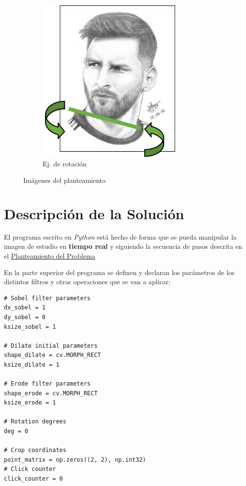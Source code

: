\documentclass[12pt, a4paper]{article}
\begin{document}
\begin{figure}[!ht]
\begin{subfigure}{0.25\textwidth}
    \end{subfigure}
    \hfill
    \begin{subfigure}{0.25\textwidth}
        \centering
        \includegraphics[width=0.8\textwidth]{img/sample-face-rotation.png}
        \caption{Ej. de rotación}
        \label{img:ejemplo-2}
    \end{subfigure}
    \caption{Imágenes del planteamiento}
\end{figure}

\section{Descripción de la Solución}
El programa escrito en \emph{Python} está hecho de forma que se pueda manipular la imagen de estudio en \textbf{tiempo real} y siguiendo la secuencia de pasos descrita en el \hyperref[Planteamiento]{Planteamiento del Problema}

En la parte superior del programa se definen y declaran los parámetros de los distintos filtros y otras operaciones que se van a aplicar:

\begin{lstlisting}
# Sobel filter parameters
dx_sobel = 1
dy_sobel = 0
ksize_sobel = 1

# Dilate initial parameters
shape_dilate = cv.MORPH_RECT
ksize_dilate = 1

# Erode filter parameters
shape_erode = cv.MORPH_RECT
ksize_erode = 1

# Rotation degrees
deg = 0

# Crop coordinates
point_matrix = np.zeros((2, 2), np.int32)
# Click counter
click_counter = 0
\end{lstlisting}
\end{document}

